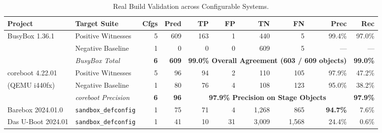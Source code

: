 \documentclass[acmsmall,screen,review]{acmart}
\begin{document}
\begin{table}[t]
\centering
\footnotesize
\setlength{\tabcolsep}{3pt}
\caption{Real Build Validation across Configurable Systems.}
\label{tab:rq4}
\begin{tabular}{llrrrrrrrr}
\toprule
\textbf{Project} & \textbf{Target Suite} & \textbf{Cfgs} & \textbf{Pred} & \textbf{TP} & \textbf{FP} & \textbf{TN} & \textbf{FN} & \textbf{Prec} & \textbf{Rec} \\
\midrule
BusyBox 1.36.1 & Positive Witnesses & 5 & 609 & 163 & 1 & 440 & 5 & 99.4\% & 97.0\% \\
& Negative Baseline & 1 & 0 & 0 & 0 & 609 & 5 & --- & --- \\
\cmidrule(lr){2-10}
& \emph{BusyBox Total} & \textbf{6} & \textbf{609} & \multicolumn{5}{c}{\textbf{99.0\% Overall Agreement (603 / 609 objects)}} & \textbf{99.0\%} \\
\midrule
coreboot 4.22.01 & Positive Witnesses & 5 & 96 & 94 & 2 & 110 & 105 & 97.9\% & 47.2\% \\
(QEMU i440fx) & Negative Baseline & 1 & 80 & 76 & 4 & 108 & 123 & 95.0\% & 38.2\% \\
\cmidrule(lr){2-10}
& \emph{coreboot Precision} & \textbf{6} & \textbf{96} & \multicolumn{5}{c}{\textbf{97.9\% Precision on Stage Objects}} & \textbf{97.9\%} \\
\midrule
Barebox 2024.01.0 & \texttt{sandbox\_defconfig} & 1 & 75 & 71 & 4 & 1,268 & 865 & \textbf{94.7\%} & 7.6\% \\
Das U-Boot 2024.01 & \texttt{sandbox\_defconfig} & 1 & 41 & 10 & 31 & 3,009 & 1,568 & 24.4\% & 0.6\% \\
\bottomrule
\end{tabular}
\end{table}
\end{document}
